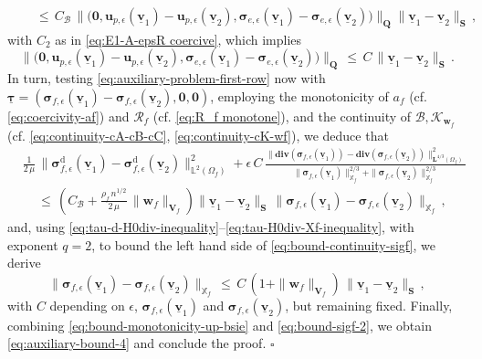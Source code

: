 \documentclass[11pt]{article}
\numberwithin{equation}{section}
\newcommand{\bsi}{{\boldsymbol\sigma}}
\newcommand{\btau}{{\boldsymbol\tau}}
\newcommand{\ubtau}{\underline{\btau}}
\newcommand{\ubv}{\underline{\bv}}
\newcommand{\bv}{{\mathbf{v}}}
\newcommand{\bw}{{\mathbf{w}}}
\newcommand{\bu}{\mathbf{u}}
\newcommand{\0}{{\mathbf{0}}}
\def\bV{\mathbf{V}}
\def\bQ{\mathbf{Q}}
\def\bS{\mathbf{S}}
\newcommand{\bL}{\mathbf{L}}
\newcommand\bbX{\mathbb{X}}
\newcommand\bbL{\mathbb{L}}
\newcommand{\cB}{\mathcal{B}}
\newcommand{\cK}{\mathcal{K}}
\newcommand{\cR}{\mathcal{R}}
\def\rd{\mathrm{d}}
\def\bdiv{\mathbf{div}}
\newenvironment{proof}{\noindent{\it Proof.}}{\hfill$\square$}
\numberwithin{equation}{section}
\begin{document}
\begin{proof}
\begin{align*}
&\quad \leq\, C_{\cB}\,\|\big(\0,\bu_{p,\epsilon}(\ubv_1) - \bu_{p,\epsilon}(\ubv_2),\bsi_{e,\epsilon}(\ubv_1) - \bsi_{e,\epsilon}(\ubv_2)\big)\|_{\bQ}\|\ubv_1 - \ubv_2\|_{\bS} \,, %
\end{align*} 
%
with $C_2$ as in \eqref{eq:E1-A-epsR coercive}, which implies
\begin{equation}\label{eq:bound-monotonicity-up-bsie}
\|\big(\0,\bu_{p,\epsilon}(\ubv_1) - \bu_{p,\epsilon}(\ubv_2),\bsi_{e,\epsilon}(\ubv_1) - \bsi_{e,\epsilon}(\ubv_2)\big)\|_{\bQ} \,\leq\, C\,\|\ubv_1 - \ubv_2\|_{\bS} \,.
\end{equation}
In turn, testing \eqref{eq:auxiliary-problem-first-row} now with $\ubtau = (\bsi_{f,\epsilon}(\ubv_1) - \bsi_{f,\epsilon}(\ubv_2), \0,\0)$, employing the monotonicity of $a_f$ (cf. \eqref{eq:coercivity-af}) and $\cR_f$ (cf. \eqref{eq:R_f monotone}), and the continuity of $\cB, \cK_{\bw_f}$ (cf. \eqref{eq:continuity-cA-cB-cC}, \eqref{eq:continuity-cK-wf}), we deduce that
\begin{align}
&\frac{1}{2\,\mu}\,\|\bsi^\rd_{f,\epsilon}(\ubv_1) - \bsi^\rd_{f,\epsilon}(\ubv_2)\|^2_{\bbL^2(\Omega_f)} + \epsilon\,C\,\frac{\|\bdiv(\bsi_{f,\epsilon}(\ubv_1)) - \bdiv(\bsi_{f,\epsilon}(\ubv_2))\|^2_{\bL^{4/3}(\Omega_f)}}{\|\bsi_{f,\epsilon}(\ubv_1)\|^{2/3}_{\bbX_f} + \|\bsi_{f,\epsilon}(\ubv_2)\|^{2/3}_{\bbX_f}} \nonumber\\ 
&\quad \, \leq \, \left(C_{\cB} + \frac{\rho_f\,n^{1/2}}{2\,\mu}\,\|\bw_f\|_{\bV_f}\right)\|\ubv_1 - \ubv_2\|_\bS\,\|\bsi_{f,\epsilon}(\ubv_1) - \bsi_{f,\epsilon}(\ubv_2)\|_{\bbX_f} \,,
\label{eq:bound-continuity-sigf}
\end{align} 
and, using \eqref{eq:tau-d-H0div-inequality}--\eqref{eq:tau-H0div-Xf-inequality}, with exponent $q=2$, to bound the left hand side of \eqref{eq:bound-continuity-sigf}, we derive
\begin{equation}\label{eq:bound-sigf-2}
\|\bsi_{f,\epsilon}(\ubv_1) - \bsi_{f,\epsilon}(\ubv_2)\|_{\bbX_f} 
\,\leq\, C\,(1 + \|\bw_f\|_{\bV_f})\,\|\ubv_1 - \ubv_2\|_\bS \,,
\end{equation}
with $C$ depending on $\epsilon$, $\bsi_{f,\epsilon}(\ubv_1)$ and $\bsi_{f,\epsilon}(\ubv_2)$, but remaining fixed.
Finally, combining \eqref{eq:bound-monotonicity-up-bsie} and \eqref{eq:bound-sigf-2}, we obtain \eqref{eq:auxiliary-bound-4} and conclude the proof.
\end{proof}
\end{document}
